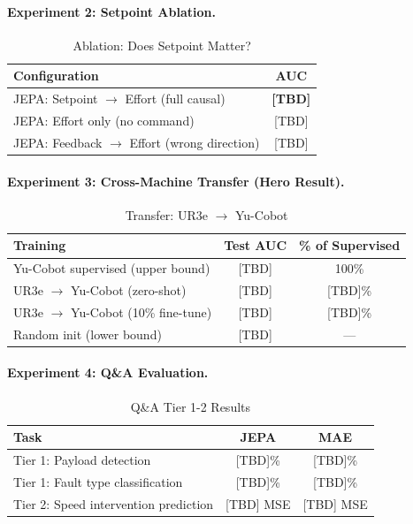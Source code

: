 \documentclass{article}
\begin{document}
\paragraph{Experiment 2: Setpoint Ablation.}

\begin{table}[h]
\centering
\caption{Ablation: Does Setpoint Matter?}
\begin{tabular}{lc}
\toprule
\textbf{Configuration} & \textbf{AUC} \\
\midrule
JEPA: Setpoint $\rightarrow$ Effort (full causal) & \textbf{[TBD]} \\
JEPA: Effort only (no command) & [TBD] \\
JEPA: Feedback $\rightarrow$ Effort (wrong direction) & [TBD] \\
\bottomrule
\end{tabular}
\end{table}

\paragraph{Experiment 3: Cross-Machine Transfer (Hero Result).}

\begin{table}[h]
\centering
\caption{Transfer: UR3e $\rightarrow$ Yu-Cobot}
\begin{tabular}{lcc}
\toprule
\textbf{Training} & \textbf{Test AUC} & \textbf{\% of Supervised} \\
\midrule
Yu-Cobot supervised (upper bound) & [TBD] & 100\% \\
UR3e $\rightarrow$ Yu-Cobot (zero-shot) & [TBD] & [TBD]\% \\
UR3e $\rightarrow$ Yu-Cobot (10\% fine-tune) & [TBD] & [TBD]\% \\
Random init (lower bound) & [TBD] & — \\
\bottomrule
\end{tabular}
\end{table}

\paragraph{Experiment 4: Q\&A Evaluation.}

\begin{table}[h]
\centering
\caption{Q\&A Tier 1-2 Results}
\begin{tabular}{lcc}
\toprule
\textbf{Task} & \textbf{JEPA} & \textbf{MAE} \\
\midrule
Tier 1: Payload detection & [TBD]\% & [TBD]\% \\
Tier 1: Fault type classification & [TBD]\% & [TBD]\% \\
Tier 2: Speed intervention prediction & [TBD] MSE & [TBD] MSE \\
\bottomrule
\end{tabular}
\end{table}
\end{document}
